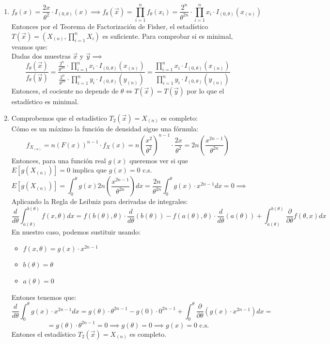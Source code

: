 \begin{sol}
	\begin{enumerate}
		\item $$f_{\theta}(x) = \frac{2x}{\theta^2} \cdot I_{(0, \theta)}(x) \implies f_{\theta}(\vec{x}) = \prod_{i = 1}^{n}f_{\theta}(x_i) = \frac{2^n}{\theta^{2n}} \cdot \prod_{i = 1}^{n}x_i \cdot I_{(0, \theta)}(x_{(n)})$$
		Entonces por el Teorema de Factorización de Fisher, el estadístico $T(\vec{x}) = (X_{(n)}, \prod_{i = 1}^{n}X_i)$ es suficiente. Para comprobar si es minimal, veamos que: \\
		Dadas dos muestras $\vec{x}$ y $\vec{y} \implies$ $$\frac{f_{\theta}(\vec{x})}{f_{\theta}(\vec{y})} = \frac{\frac{2^n}{\theta^{2n}} \cdot \prod_{i = 1}^{n}x_i \cdot I_{(0, \theta)}(x_{(n)})}{\frac{2^n}{\theta^{2n}} \cdot \prod_{i = 1}^{n}y_i \cdot I_{(0, \theta)}(y_{(n)})} = \frac{\prod_{i = 1}^{n}x_i \cdot I_{(0, \theta)}(x_{(n)})}{\prod_{i = 1}^{n}y_i \cdot I_{(0, \theta)}(y_{(n)})}$$
		Entonces, el cociente no depende de $\theta \iff T(\vec{x}) = T(\vec{y})$ por lo que el estadístico es minimal.
		\item Comprobemos que el estadístico $T_2(\vec{x}) = X_{(n)}$ es completo: \\
		Cómo es un máximo la función de densidad sigue una fórmula: 
		$$f_{X_{(n)}} = n(F(x))^{n-1} \cdot f_{X}(x) = n\left(\frac{x^2}{\theta^2}\right)^{n-1} \cdot \frac{2x}{\theta^2} = 2n\left(\frac{x^{2n-1}}{\theta^{2n}}\right)$$
		Entonces, para una función real $g(x)$ queremos ver si que $E[g(X_{(n)})] = 0$ implica que $g(x) = 0$ c.s.\\
		$$E[g(X_{(n)})] = \int_{0}^{\theta}g(x)2n\left(\frac{x^{2n-1}}{\theta^{2n}}\right)dx = \frac{2n}{\theta^{2n}}\int_{0}^{\theta}g(x) \cdot x^{2n-1}dx = 0 \implies$$
		Aplicando la Regla de Leibniz para derivadas de integrales: 
		$$\frac{d}{d\theta}\int_{a(\theta)}^{b(\theta)} f(x, \theta)dx = f(b(\theta), \theta) \cdot \frac{d}{d\theta}(b(\theta)) - f(a(\theta), \theta) \cdot \frac{d}{d\theta}(a(\theta)) + \int_{a(\theta)}^{b(\theta)} \frac{\partial}{\partial \theta}f(\theta, x) dx$$
		En nuestro caso, podemos sustituir usando: 
		\begin{itemize}
			\item $f(x, \theta) = g(x)\cdot x^{2n-1}$
			\item $b(\theta) = \theta$
			\item $a(\theta) = 0$
		\end{itemize}
		Entones tenemos que:
		$$\frac{d}{d\theta}\int_{0}^{\theta}g(x) \cdot x^{2n-1}dx = g(\theta)\cdot \theta^{2n-1} - g(0)\cdot 0^{2n-1} + \int_{0}^{\theta} \frac{\partial}{\partial \theta}(g(x) \cdot x^{2n-1})dx = $$ $$ = g(\theta)\cdot \theta^{2n-1} = 0 \implies g(\theta) = 0 \implies g(x) = 0 \text{ c.s.}$$
		Entones el estadístico $T_2(\vec{x}) = X_{(n)}$ es completo.
	\end{enumerate}
\end{sol}